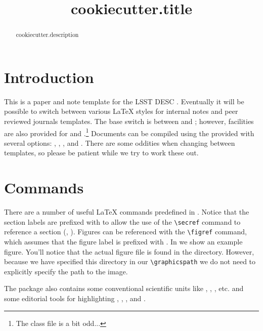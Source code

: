\documentclass[\docopts]{\docclass}
\begin{document}
\title{ {{ cookiecutter.title }} }

\maketitlepre

\begin{abstract}

{{ cookiecutter.description }}


\end{abstract}

\maketitlepost

\section{Introduction}
\label{sec:intro}

This is a paper and note template for the LSST DESC \citep{Overview,ScienceBook,WhitePaper}.
Eventually it will be possible to switch between various \LaTeX\xspace styles for internal notes and peer reviewed journals templates.
The base switch is between  and ; however, facilities are also provided for  and .\footnote{The  class file is a bit odd...}
Documents can be compiled using the provided  with several options: , , , and .
There are some oddities when changing between templates, so please be patient while we try to work these out.

\section{Commands}
\label{sec:commands}

There are a number of useful \LaTeX\xspace commands predefined in .
Notice that the section labels are prefixed with  to allow the use of the \verb=\secref= command to reference a section (\ie, ).
Figures can be referenced with the \verb=\figref= command, which assumes that the figure label is prefixed with .
In  we show an example figure.
You'll notice that the actual figure file is found in the  directory.
However, because we have specified this directory in our \verb=\graphicspath= we do not need to explicitly specify the path to the image.

The  package also contains some conventional scientific units like \angstrom, \GeV, \Msun, etc. and some editorial tools for highlighting , , , and .
\end{document}
